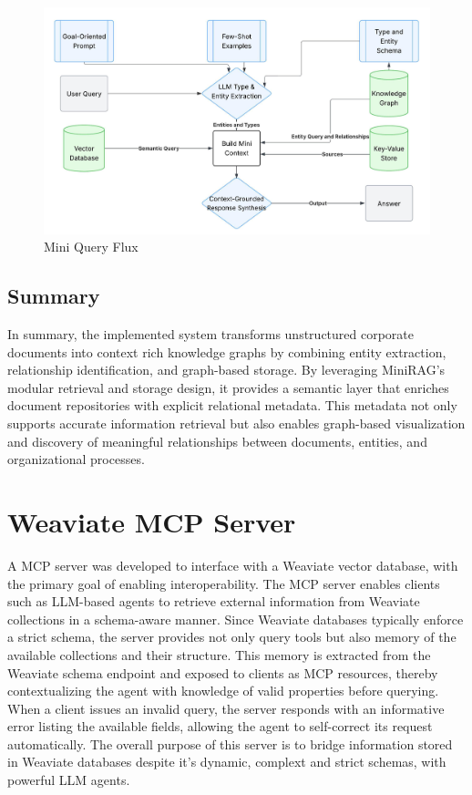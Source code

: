 \begin{figure}
    \centering
    \includegraphics[width=0.75\linewidth]{Images/Fluxograma_Mini_Query.jpeg}
    \caption{Mini Query Flux}
    \label{fig:placeholder}
\end{figure}
\subsection{Summary}

In summary, the implemented system transforms unstructured corporate documents into context rich knowledge graphs by combining entity extraction, relationship identification, and graph-based storage.  
By leveraging MiniRAG’s modular retrieval and storage design, it provides a semantic layer that enriches document repositories with explicit relational metadata.  
This metadata not only supports accurate information retrieval but also enables graph-based visualization and discovery of meaningful relationships between documents, entities, and organizational processes.

\section{Weaviate MCP Server}

A \ac{MCP} server was developed to interface with a Weaviate vector database, with the primary goal of enabling interoperability. The MCP server enables clients such as \ac{LLM}-based agents to retrieve external information from Weaviate collections in a schema-aware manner. Since Weaviate databases typically enforce a strict schema, the server provides not only query tools but also memory of the available collections and their structure. This memory is extracted from the Weaviate schema endpoint and exposed to clients as MCP resources, thereby contextualizing the agent with knowledge of valid properties before querying. When a client issues an invalid query, the server responds with an informative error listing the available fields, allowing the agent to self-correct its request automatically. The overall purpose of this server is to bridge information stored in Weaviate databases despite it's dynamic, complext and strict schemas, with powerful \ac{LLM} agents.

